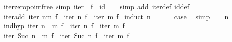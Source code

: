 \begin{isabellebody}
\isamarkupfalse%
%
\endisatagproof
{\isafoldproof}%
%
\isadelimproof
\isanewline
%
\endisadelimproof
\isanewline
{}\isamarkupfalse%
\ iter{}zero{}pointfree\ {}simp{}{}\ {}iter\ {}\ f\ {}\ id{}\isanewline
%
\isadelimproof
\ \ %
\endisadelimproof
%
\isatagproof
{}\isamarkupfalse%
\ {}simp\ add{}\ iter{}def\ id{}def{}%
\endisatagproof
{\isafoldproof}%
%
\isadelimproof
\isanewline
%
\endisadelimproof
\isanewline
{}\isamarkupfalse%
\ iter{}add{}\ {}iter\ {}n{}m{}\ f\ {}\ iter\ n\ f\ {}\ iter\ m\ f{}\isanewline
%
\isadelimproof
%
\endisadelimproof
%
\isatagproof
{}\isamarkupfalse%
\ {}induct\ n{}\isanewline
\ \ \isamarkupfalse%
\ {}\ \isamarkupfalse%
\ {}case\ \isamarkupfalse%
\ simp\isanewline
{}\isamarkupfalse%
\isanewline
\ \ \isamarkupfalse%
\ n\ \isamarkupfalse%
\ ind{}hyp{}\ {}iter\ {}n\ {}\ m{}\ f\ {}\ iter\ n\ f\ {}\ iter\ m\ f{}\isanewline
\ \ \isamarkupfalse%
\ {}iter\ {}Suc\ n\ {}\ m{}\ f\ {}\ iter\ {}Suc\ n{}\ f\ {}\ iter\ m\ f{}\isanewline

\end{isabellebody}
